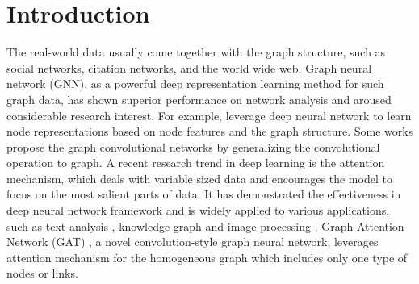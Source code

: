 \section{Introduction}
The real-world data usually come together with the graph structure, 
such as social networks, citation networks, and the world wide web. Graph neural network (GNN), 
as a powerful deep representation learning method for such graph data, 
has shown superior performance on network analysis and aroused considerable research interest. 
For example, \cite{gnn05,gnn09,ggnn}
leverage deep neural network to learn node representations based on node features and the graph structure. 
Some works \cite{16chebyshev,gcn,graphsage} 
propose the graph convolutional networks by generalizing the convolutional operation to graph.
A recent research trend in deep learning is the attention mechanism,
which deals with variable sized data and encourages the model to focus on the most salient parts of data. 
It has demonstrated the effectiveness in deep neural network framework and is widely applied to various applications, such as text analysis \cite{bahdanau2014neural}, knowledge graph \cite{schlichtkrull2018modeling} and image processing \cite{show_xu2015show}.
Graph Attention Network (GAT) \cite{gat}, a novel convolution-style graph neural network, leverages attention mechanism for the homogeneous graph which includes only one type of nodes or links.

